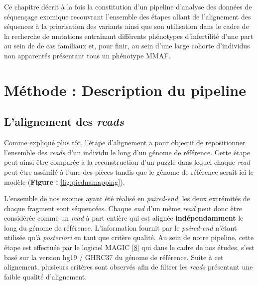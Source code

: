 \documentclass[12pt,twoside]{reedthesis}
\theoremstyle{definition}
\theoremstyle{definition}
\theoremstyle{remark}
\begin{document}
  Ce chapitre décrit à la fois la constitution d'un pipeline d'analyse des
  données de séquençage exomique recouvrant l'ensemble des étapes allant
  de l'alignement des séquences à la priorisation des variants ainsi que
  son utilisation dans le cadre de la recherche de mutations entrainant
  différents phénotypes d'infertilité d'une part au sein de de cas
  familiaux et, pour finir, au sein d'une large cohorte d'individus non
  apparentés présentant tous un phénotype MMAF.
  
  \newpage
  
  \section{Méthode : Description du
  pipeline}\label{methode-description-du-pipeline}
  
  \subsection{\texorpdfstring{L'alignement des
  \emph{reads}}{L'alignement des reads}}\label{lalignement-des-reads}
  
  Comme expliqué plus tôt, l'étape d'alignement a pour objectif de
  repositionner l'ensemble des \emph{reads} d'un individu le long d'un
  génome de référence. Cette étape peut ainsi être comparée à la
  reconstruction d'un puzzle dans lequel chaque \emph{read} peut-être
  assimilé à l'une des pièces tandis que le génome de référence serait ici
  le modèle (\textbf{Figure : }\ref{fig:picdnamapping}).
  
  L'ensemble de nos exomes ayant été réalisé en \emph{paired-end}, les
  deux extrémités de chaque fragment sont séquencées. Chaque \emph{end}
  d'un même \emph{read} peut donc être considérée comme un \emph{read} à
  part entière qui est alignée \textbf{indépendamment} le long du génome
  de référence. L'information fournit par le \emph{paired-end} n'étant
  utilisée qu'à \emph{posteriori} en tant que critère qualité. Au sein de
  notre pipeline, cette étape est effectuée par le logiciel MAGIC
  {[}\protect\hyperlink{ref-Su2014}{8}{]} qui dans le cadre de nos études,
  s'est basé sur la version hg19 / GHRC37 du génome de référence. Suite à
  cet alignement, plusieurs critères sont observés afin de filtrer les
  \emph{reads} présentant une faible qualité d'alignement.
  
\end{document}
